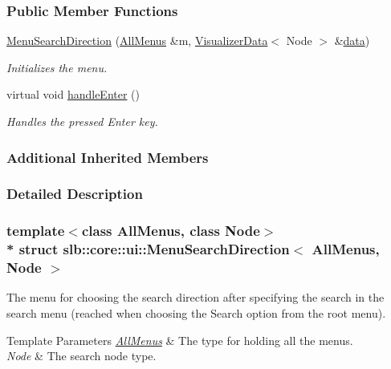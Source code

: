 \subsubsection*{Public Member Functions}
\begin{DoxyCompactItemize}
\item 
\hyperlink{structslb_1_1core_1_1ui_1_1MenuSearchDirection_a60867fb34560d501639b0ed927642ff5}{Menu\+Search\+Direction} (\hyperlink{structslb_1_1core_1_1ui_1_1AllMenus}{All\+Menus} \&m, \hyperlink{structslb_1_1core_1_1ui_1_1VisualizerData}{Visualizer\+Data}$<$ Node $>$ \&\hyperlink{structslb_1_1core_1_1ui_1_1MenuBase_a475d9457affb2b4fc96737e269d6911f}{data})
\begin{DoxyCompactList}\small\item\em Initializes the menu. \end{DoxyCompactList}\item 
virtual void \hyperlink{structslb_1_1core_1_1ui_1_1MenuSearchDirection_a95ed7c81a7e7c5ab71fb88dc7db3e8a3}{handle\+Enter} ()\hypertarget{structslb_1_1core_1_1ui_1_1MenuSearchDirection_a95ed7c81a7e7c5ab71fb88dc7db3e8a3}{}\label{structslb_1_1core_1_1ui_1_1MenuSearchDirection_a95ed7c81a7e7c5ab71fb88dc7db3e8a3}

\begin{DoxyCompactList}\small\item\em Handles the pressed Enter key. \end{DoxyCompactList}\end{DoxyCompactItemize}
\subsubsection*{Additional Inherited Members}


\subsubsection{Detailed Description}
\subsubsection*{template$<$class All\+Menus, class Node$>$\\*
struct slb\+::core\+::ui\+::\+Menu\+Search\+Direction$<$ All\+Menus, Node $>$}

The menu for choosing the search direction after specifying the search in the search menu (reached when choosing the Search option from the root menu). 


\begin{DoxyTemplParams}{Template Parameters}
{\em \hyperlink{structslb_1_1core_1_1ui_1_1AllMenus}{All\+Menus}} & The type for holding all the menus. \\
\hline
{\em Node} & The search node type. \\
\hline
\end{DoxyTemplParams}


